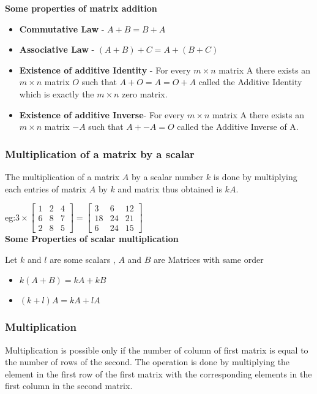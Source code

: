 \documentclass[12pt]{article}
\begin{document}
                               \textbf{ \large Some properties of matrix addition }
        \begin{itemize}
            \item \textbf{Commutative Law} - $A+B=B+A$
            \item \textbf{Associative Law} - $(A+B)+C =A+(B+C)$
            \item \textbf{Existence of additive Identity} - For every $m \times n$ matrix A there exists an $m \times n$ matrix $O$ such that $A+O=A=O+A$ called the Additive Identity which is exactly the $m \times n$ zero matrix.
            \item \textbf{Existence of additive Inverse}-  For every $m \times n$ matrix A there exists an $m \times n$ matrix $-A$ such that $A+ -A =O$ called the Additive Inverse of A. 
        \end{itemize}
    \subsubsection*{Multiplication of a matrix by a scalar}
    The multiplication of a matrix $A$ by a scalar number $k$ is done by multiplying each entries of matrix $A$ by $k$ and matrix thus obtained is $kA$.

    eg:$3 \times \begin{bmatrix}
        1 &2  &4\\
        6 & 8 & 7\\
        2 &8 &5
        \end{bmatrix}=\begin{bmatrix}
            3 &6  &12\\
            18 & 24 & 21\\
            6 &24 &15
            \end{bmatrix}$\\


    \textbf{\large Some Properties of scalar multiplication }

    Let $k$ and $l$ are some scalars , $A$ and $B$ are Matrices with same order
    \begin{itemize}
        \item $k(A+B)=kA+kB$
        \item $(k+l)A=kA+lA$

    \end{itemize}

\subsubsection*{Multiplication}
Multiplication is possible only if the number of column of first matrix is equal to the number of rows of the second. The operation is done by multiplying the element in the first row of the first matrix with the corresponding elements in the first column in the second matrix.
\end{document}

